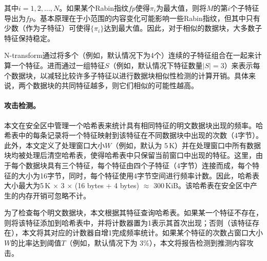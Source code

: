 其中$i = 1, 2,\ldots, N$。如果某个Rabin指纹$fp$使得$\pi_i$为最大值，则将$M$的第$i$个子特征导出为$fp$。基本原理在于小范围的内容变化可能影响一些Rabin指纹，但其中只有少数（作为子特征）可使得$\{\pi_i\}$达到最大值。因此，对于相似的数据块，大多数子特征保持稳定。

N-transform通过将多个（例如，默认情况下为4个）连续的子特征组合在一起来计算一个特征。进而通过一组特征$S$（例如，默认情况下特征数量$|S| = 3$）来表示每个数据块，以减轻比较许多子特征以进行数据块相似性检测的计算开销。具体来说，两个数据块的共同特征越多，则它们相似的可能性越高。

\paragraph*{攻击检测。}

本文在安全区中管理一个哈希表来统计具有相同特征的明文数据块出现的频率。哈希表中的每条记录将一个特征映射到该特征在不同数据块中出现的次数（4字节）。此外，本文定义了处理窗口大小$W$（例如，默认为 5\,K）并在处理窗口中所有数据块均被处理后清空哈希表，使得哈希表中只保留当前窗口中出现的特征。这里，由于每个数据块具有三个特征，每个特征由四个子特征（4字节）连接而成，每个特征的大小为16字节，同时，每个特征使用4字节空间进行频率计数。因此，哈希表大小最大为5\,K $\times$ 3 $\times$ (16 bytes + 4 bytes) $\approx$ 300\,KiB。该哈希表在安全区中产生的内存开销可忽略不计。

为了检查每个明文数据块，本文根据其特征查询哈希表。如果某一个特征不存在，则将该特征添加到哈希表中，并将计数器置为1表示其首次出现；否则（该特征存在），本文将其对应的计数器自增1完成频率统计。如果某个特征的次数占窗口大小$W$的比率达到阈值$T$（例如，默认情况下为 3\%），本文将报告检测到推测内容攻击。
